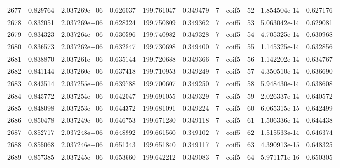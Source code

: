\begin{tabular}{lrrrrrrlrrr}
2677 &    0.829764 &        2.037269e+06 &  0.626037 &              199.761047 &    0.349479 &       7 &        coif5 &     52 &   1.854504e-14 &      0.627176 \\
2678 &    0.832051 &        2.037269e+06 &  0.628324 &              199.750809 &    0.349362 &       7 &        coif5 &     53 &   5.063042e-14 &      0.629081 \\
2679 &    0.834323 &        2.037264e+06 &  0.630596 &              199.740982 &    0.349328 &       7 &        coif5 &     54 &   4.705325e-14 &      0.630968 \\
2680 &    0.836573 &        2.037262e+06 &  0.632847 &              199.730698 &    0.349400 &       7 &        coif5 &     55 &   1.145325e-14 &      0.632856 \\
2681 &    0.838870 &        2.037261e+06 &  0.635144 &              199.720688 &    0.349366 &       7 &        coif5 &     56 &   1.142202e-14 &      0.634767 \\
2682 &    0.841144 &        2.037260e+06 &  0.637418 &              199.710953 &    0.349249 &       7 &        coif5 &     57 &   4.350510e-14 &      0.636690 \\
2683 &    0.843514 &        2.037255e+06 &  0.639788 &              199.700607 &    0.349250 &       7 &        coif5 &     58 &   5.948430e-14 &      0.638608 \\
2684 &    0.845772 &        2.037254e+06 &  0.642047 &              199.691055 &    0.349329 &       7 &        coif5 &     59 &   2.026337e-14 &      0.640572 \\
2685 &    0.848098 &        2.037253e+06 &  0.644372 &              199.681091 &    0.349224 &       7 &        coif5 &     60 &   6.065315e-15 &      0.642499 \\
2686 &    0.850478 &        2.037249e+06 &  0.646753 &              199.671280 &    0.349118 &       7 &        coif5 &     61 &   1.506336e-14 &      0.644438 \\
2687 &    0.852717 &        2.037248e+06 &  0.648992 &              199.661560 &    0.349102 &       7 &        coif5 &     62 &   1.515533e-14 &      0.646374 \\
2688 &    0.855068 &        2.037246e+06 &  0.651343 &              199.651840 &    0.349117 &       7 &        coif5 &     63 &   4.390913e-15 &      0.648325 \\
2689 &    0.857385 &        2.037245e+06 &  0.653660 &              199.642212 &    0.349083 &       7 &        coif5 &     64 &   5.971171e-16 &      0.650305 \\

\end{tabular}
